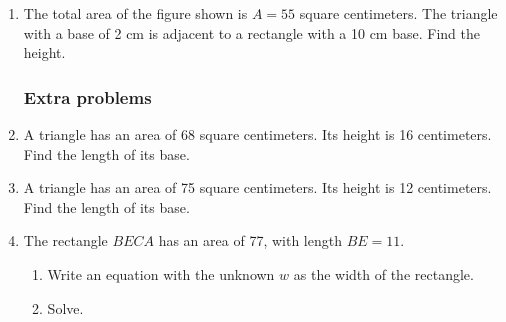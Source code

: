 \begin{enumerate}
\item The total area of the figure shown is $A=55$ square centimeters. The triangle with a base of 2 cm is adjacent to a rectangle with a 10 cm base. Find the height. \par \medskip
  \begin{flushleft}
  \end{flushleft}

\newpage
\subsubsection*{Extra problems}
\item A triangle has an area of 68 square centimeters. Its height is 16 centimeters. Find the length of its base. \vspace{2cm}

\item A triangle has an area of 75 square centimeters. Its height is 12 centimeters. Find the length of its base. \vspace{2cm}

\item The rectangle $BECA$ has an area of 77, with length $BE=11$.
  \begin{enumerate}
    \item Write an equation with the unknown $w$ as the width of the rectangle. 
    \item Solve.
  \end{enumerate}
  \begin{flushright}
  \end{flushright}


\end{enumerate}

